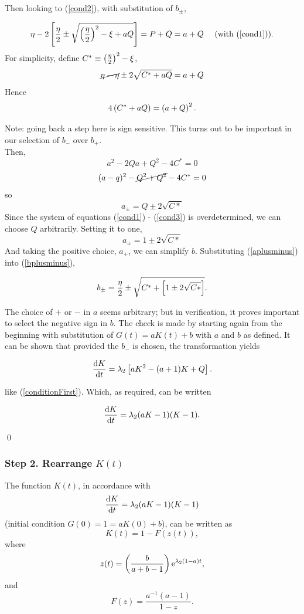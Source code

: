   \noindent
 Then looking to (\ref{cond2}), with substitution of $b_\pm$,
 
 $$\eta - 2 \left[\frac{\eta}{2} \pm \sqrt{\left(\frac{\eta}{2}\right)^2 - \xi + aQ} \right] = P +Q = a + Q \quad\text{ (with (\ref{cond1}))}.$$
For simplicity, define $C^* \equiv\left(\frac{\eta}{2}\right)^2 - \xi  $,
$$ \cancel{\eta - \eta }  \pm 2 \sqrt{C^* +aQ} = {a+Q}$$
Hence
$$4\left( C^* +aQ\right) =  \left( a+Q\right)^2.$$

\noindent
Note: going back a step here is sign sensitive. This turns out to be important in our selection of $b_-$ over $b_+$.\\ Then,
$$a^2 - 2Qa + Q^2 - 4C^* = 0$$
$$(a-q)^2 -\cancel{Q^2 +Q^2} - 4C^* = 0$$
so
$$a_\pm = Q \pm 2\sqrt{C*}$$
Since the system of equations (\ref{cond1}) - (\ref{cond3}) is overdetermined, we can choose $Q$ arbitrarily. Setting it to one,
\begin{equation}
\label{aplusminus}
a_\pm = 1 \pm 2\sqrt{C*}
\end{equation}
And taking the positive choice, $a_+$, we can simplify $b$. Substituting (\ref{aplusminus}) into (\ref{bplusminus}), 

$$b_{\pm} = \frac{\eta}{2} \pm \sqrt{  C^* +  \left[ 1 \pm 2\sqrt{C*}  \right]}.$$ 

\noindent
The choice of $+$ or $-$ in $a$ seems arbitrary; but in verification, it proves important to select the negative sign in $b$. The check is made by starting again from the beginning with substitution of $G(t) = aK(t) + b$ with $a$ and $b$ as defined. It can be shown that provided the $b_-$ is chosen, the transformation yields

$$\displaystyle\frac{{\rm d} K}{{\rm d} t} = \lambda_2\left[ aK^2 - (a + 1)K + Q\right].$$

\noindent
like (\ref{conditionFirst}). Which, as required, can be written

$$\displaystyle\frac{{\rm d} K}{{\rm d} t} = \lambda_2{(aK-1)(K-1)}.$$

\qed



\subsubsection{Step 2. Rearrange $K(t)$}

\begin{lemma}
The function $K(t)$, in accordance with 
\begin{equation}
\label{eqdesk}
 \displaystyle\frac{{\rm d} K}{{\rm d} t} = \lambda_2 (aK - 1)(K-1)
\end{equation}
(initial condition $G(0) = 1 = aK(0) + b$), can be written as
$$K(t) = 1-F(z(t)),$$
where 
$$z(t) = \left(\frac{b}{a+b-1}\right) {\rm e}^{\lambda_2 (1-a) t},$$
and 
$$F(z) = \frac{a^{-1}(a-1)}{1-z}.$$
\end{lemma}


